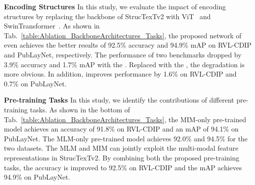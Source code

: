 \documentclass{article} \usepackage{iclr2023_conference,times}
\begin{document}
\begin{table}[ht]
\caption{The ablation study on pre-training tasks and different encoding structures.}
\label{table:Ablation_BackboneArchitectures_Tasks}
\vspace{-1em}
\begin{center}
\end{center}
\vspace{-0.5em}
\end{table}

\noindent\textbf{Encoding Structures} In this study, we evaluate the impact of encoding structures by replacing the backbone of StrucTexTv2 with ViT~\cite{DBLP:journals/corr/abs-2010-11929} and SwinTransformer~\cite{liu2021swin}. As shown in Tab.~\ref{table:Ablation_BackboneArchitectures_Tasks}, the proposed network of  even achieves the better results of 92.5\% accuracy and 94.9\% mAP on RVL-CDIP and PubLayNet, respectively. The performance of two benchmarks dropped by 3.9\% accuracy and 1.7\% mAP with the . Replaced with the , the degradation is more obvious. In addition,  improves performance by 1.6\% on RVL-CDIP and 0.7\% on PubLayNet.

\noindent\textbf{Pre-training Tasks} In this study, we identify the contributions of different pre-training tasks. As shown in the bottom of Tab.~\ref{table:Ablation_BackboneArchitectures_Tasks}, the MIM-only pre-trained model achieves an accuracy of 91.8\% on RVL-CDIP and an mAP of 94.1\% on PubLayNet. The MLM-only pre-trained model achieves 92.0\% and 94.5\% for the two datasets. The MLM and MIM can jointly exploit the multi-modal feature representations in StrucTexTv2. By combining both the proposed pre-training tasks, the accuracy is improved to 92.5\% on RVL-CDIP and the mAP achieves 94.9\% on PubLayNet.
\end{document}
